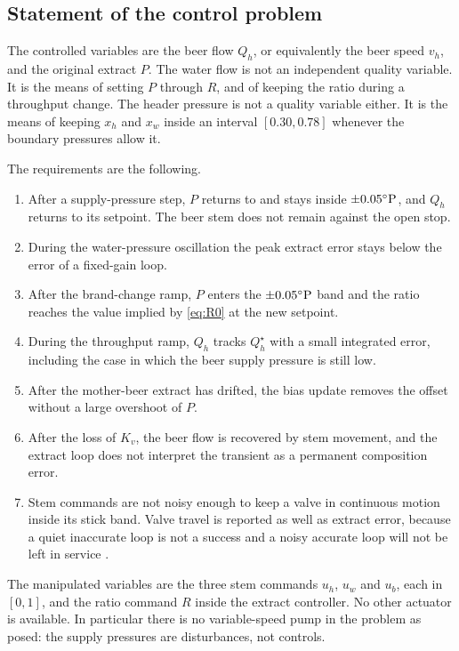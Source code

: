 \subsection{Statement of the control problem}

The controlled variables are the beer flow $Q_h$, or equivalently the beer speed $v_h$, and the original extract $P$. The water flow is not an independent quality variable. It is the means of setting $P$ through $R$, and of keeping the ratio during a throughput change. The header pressure is not a quality variable either. It is the means of keeping $x_h$ and $x_w$ inside an interval $[0.30,0.78]$ whenever the boundary pressures allow it.

The requirements are the following.

\begin{enumerate}
\item After a supply-pressure step, $P$ returns to and stays inside $\pm 0.05^{\circ}\mathrm{P}$, and $Q_h$ returns to its setpoint. The beer stem does not remain against the open stop.
\item During the water-pressure oscillation the peak extract error stays below the error of a fixed-gain loop.
\item After the brand-change ramp, $P$ enters the $\pm 0.05^{\circ}\mathrm{P}$ band and the ratio reaches the value implied by \eqref{eq:R0} at the new setpoint.
\item During the throughput ramp, $Q_h$ tracks $Q_h^\star$ with a small integrated error, including the case in which the beer supply pressure is still low.
\item After the mother-beer extract has drifted, the bias update removes the offset without a large overshoot of $P$.
\item After the loss of $K_v$, the beer flow is recovered by stem movement, and the extract loop does not interpret the transient as a permanent composition error.
\item Stem commands are not noisy enough to keep a valve in continuous motion inside its stick band. Valve travel is reported as well as extract error, because a quiet inaccurate loop is not a success and a noisy accurate loop will not be left in service \cite{bialkowski1993dreams,hagglund1995monitor}.
\end{enumerate}

The manipulated variables are the three stem commands $u_h$, $u_w$ and $u_b$, each in $[0,1]$, and the ratio command $R$ inside the extract controller. No other actuator is available. In particular there is no variable-speed pump in the problem as posed: the supply pressures are disturbances, not controls.

